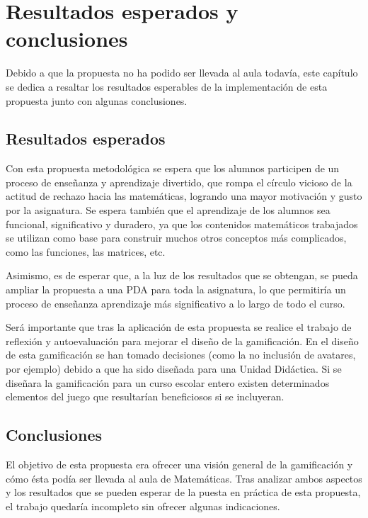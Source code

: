 
\chapter{Resultados esperados y conclusiones}
\label{chap:conclusiones}

Debido a que la propuesta no ha podido ser llevada al aula todavía, este capítulo se dedica a resaltar los resultados esperables de la implementación de esta propuesta junto con algunas conclusiones.

\section{Resultados esperados}

Con esta propuesta metodológica se espera que los alumnos participen de un proceso de enseñanza y aprendizaje divertido, que rompa el círculo vicioso de la actitud de rechazo hacia las matemáticas, logrando una mayor motivación y gusto por la asignatura.
%
Se espera también que el aprendizaje de los alumnos sea funcional, significativo y duradero, ya que los contenidos matemáticos trabajados se utilizan como base para construir muchos otros conceptos más complicados, como las funciones, las matrices, etc.

Asimismo, es de esperar que, a la luz de los resultados que se obtengan, se pueda ampliar la propuesta a una \gls{PDA} para toda la asignatura, lo que permitiría un proceso de enseñanza aprendizaje más significativo a lo largo de todo el curso.

Será importante que tras la aplicación de esta propuesta se realice el trabajo de reflexión y autoevaluación para mejorar el diseño de la gamificación.
%
En el diseño de esta gamificación se han tomado decisiones (como la no inclusión de avatares, por ejemplo) debido a que ha sido diseñada para una Unidad Didáctica.
%
Si se diseñara la gamificación para un curso escolar entero existen determinados elementos del juego que resultarían beneficiosos si se incluyeran.

\section{Conclusiones}

El objetivo de esta propuesta era ofrecer una visión general de la gamificación y cómo ésta podía ser llevada al aula de Matemáticas.
%
Tras analizar ambos aspectos y los resultados que se pueden esperar de la puesta en práctica de esta propuesta, el trabajo quedaría incompleto sin ofrecer algunas indicaciones.

